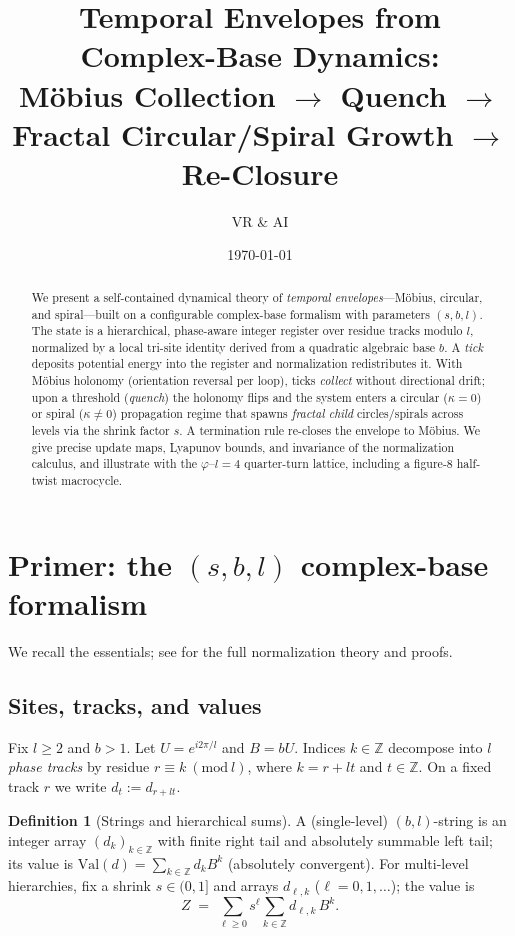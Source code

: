 \documentclass[11pt]{article}
\title{\textbf{Temporal Envelopes from Complex-Base Dynamics:\\
M\"obius Collection $\to$ Quench $\to$ Fractal Circular/Spiral Growth $\to$ Re-Closure}}
\author{VR \& AI}
\date{\today}
\theoremstyle{definition}
\newtheorem{definition}[theorem]{Definition}
\theoremstyle{remark}
\newcommand{\Z}{\mathbb{Z}}
\newcommand{\Val}{\mathrm{Val}}
\begin{document}
\maketitle

\begin{abstract}
We present a self-contained dynamical theory of \emph{temporal envelopes}---M\"obius, circular, and spiral---built on a configurable complex-base formalism with parameters $(s,b,l)$. The state is a hierarchical, phase-aware integer register over residue tracks modulo $l$, normalized by a local tri-site identity derived from a quadratic algebraic base $b$. A \emph{tick} deposits potential energy into the register and normalization redistributes it. With M\"obius holonomy (orientation reversal per loop), ticks \emph{collect} without directional drift; upon a threshold (\emph{quench}) the holonomy flips and the system enters a circular ($\kappa=0$) or spiral ($\kappa\neq0$) propagation regime that spawns \emph{fractal child} circles/spirals across levels via the shrink factor $s$. A termination rule re-closes the envelope to M\"obius. We give precise update maps, Lyapunov bounds, and invariance of the normalization calculus, and illustrate with the $\varphi$--$l=4$ quarter-turn lattice, including a figure-8 half-twist macrocycle.
\end{abstract}

\tableofcontents

\section{Primer: the $(s,b,l)$ complex-base formalism}\label{sec:primer}

We recall the essentials; see \cite{VR_AI_ComplexBase} for the full normalization theory and proofs.

\subsection{Sites, tracks, and values}
Fix $l\ge2$ and $b>1$. Let $U=e^{i2\pi/l}$ and $B=bU$.
Indices $k\in\Z$ decompose into $l$ \emph{phase tracks} by residue $r\equiv k\ (\mathrm{mod}\ l)$, where $k=r+lt$ and $t\in\Z$. On a fixed track $r$ we write $d_t:=d_{r+lt}$.

\begin{definition}[Strings and hierarchical sums]
A (single-level) $(b,l)$-string is an integer array $(d_k)_{k\in\Z}$ with finite right tail and absolutely summable left tail; its value is
$\Val(d)=\sum_{k\in\Z} d_k B^k$ (absolutely convergent).
For multi-level hierarchies, fix a shrink $s\in(0,1]$ and arrays $d_{\ell,k}$ ($\ell=0,1,\dots$); the value is
\begin{equation}
Z \;=\; \sum_{\ell\ge0} s^\ell \sum_{k\in\Z} d_{\ell,k}\,B^k.
\end{equation}
\end{definition}
\end{document}
